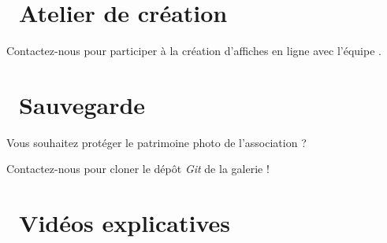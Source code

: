 \documentclass[12pt,nofoldmark,notumble]{leaflet}
\begin{document}
\section{\faUniversity  Atelier de création}

Contactez-nous pour participer à la création d'affiches en ligne
avec l'équipe .

\begin{center}
  \setlength{\fboxsep}{0pt}%
  \setlength{\fboxrule}{0pt}%
\end{center}
\vspace*{\fill}
\section{\faSave  Sauvegarde}

Vous souhaitez protéger le patrimoine photo de l'association ?

Contactez-nous pour cloner le dépôt \emph{Git} de la galerie !
\vspace*{\fill}
\section{\faYoutube  Vidéos explicatives}


\begin{center}
  \setlength{\fboxsep}{0pt}%
  \setlength{\fboxrule}{0pt}%
 \end{center} 
\end{document}
